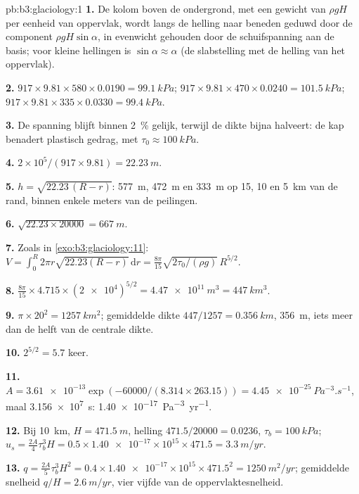 \begin{solution}{pb:b3:glaciology:1}
\textbf{1.} De kolom boven de ondergrond, met een gewicht van $\rho gH$ per eenheid van oppervlak, wordt
langs de helling naar beneden geduwd door de component $\rho gH\sin\alpha$, in evenwicht gehouden door de
schuifspanning aan de basis; voor kleine hellingen is $\sin\alpha \approx \alpha$ (de
slabstelling met de helling van het oppervlak).

\textbf{2.} $917\times9.81\times580\times0.0190 = \qty{99.1}{kPa}$;
$917\times9.81\times470\times0.0240 = \qty{101.5}{kPa}$; $917\times9.81
\times335\times0.0330 = \qty{99.4}{kPa}$.

\textbf{3.} De spanning blijft binnen \qty{2}{\percent} gelijk, terwijl de
dikte bijna halveert: de kap benadert plastisch gedrag, met $\tau_0 \approx
\qty{100}{kPa}$.

\textbf{4.} $2\times10^5/(917\times9.81) = \qty{22.23}{m}$.

\textbf{5.} $h = \sqrt{22.23\,(R - r)}$: \qty{577}{m}, \qty{472}{m} en
\qty{333}{m} op 15, 10 en \qty{5}{km} van de rand, binnen
enkele meters van de peilingen.

\textbf{6.} $\sqrt{22.23\times20000} = \qty{667}{m}$.

\textbf{7.} Zoals in \cref{exo:b3:glaciology:11}: $V = \int_0^R2\pi r
\sqrt{22.23(R - r)}\,\mathrm dr = \frac{8\pi}{15}\sqrt{2\tau_0/(\rho
g)}\,R^{5/2}$.

\textbf{8.} $\frac{8\pi}{15}\times4.715\times(\num{2e4})^{5/2} =
\qty{4.47e11}{m^3} = \qty{447}{km^3}$.

\textbf{9.} $\pi\times20^2 = \qty{1257}{km^2}$; gemiddelde dikte
$447/1257 = \qty{0.356}{km}$, \qty{356}{m}, iets meer dan de helft van de
centrale dikte.

\textbf{10.} $2^{5/2} = 5.7$ keer.

\textbf{11.} $A = \num{3.61e-13}\exp(-60000/(8.314\times263.15)) =
\qty{4.45e-25}{Pa^{-3}.s^{-1}}$, maal \qty{3.156e7}{s}:
\qty{1.40e-17}{Pa^{-3}.yr^{-1}}.

\textbf{12.} Bij \qty{10}{km}, $H = \qty{471.5}{m}$, helling $471.5/20000 =
\num{0.0236}$, $\tau_b = \qty{100}{kPa}$; $u_s = \tfrac{2A}{4}\tau_b^3H =
0.5\times\num{1.40e-17}\times10^{15}\times471.5 = \qty{3.3}{m/yr}$.

\textbf{13.} $q = \tfrac{2A}{5}\tau_b^3H^2 = 0.4\times\num{1.40e-17}
\times10^{15}\times471.5^2 = \qty{1250}{m^2/yr}$; gemiddelde snelheid $q/H =
\qty{2.6}{m/yr}$, vier vijfde van de oppervlaktesnelheid.


\end{solution}
